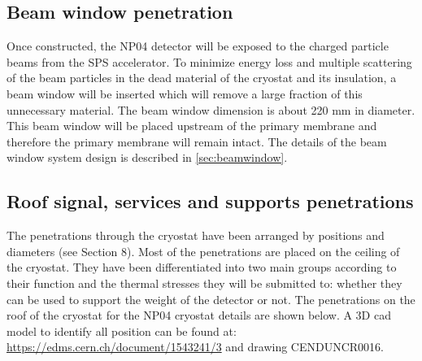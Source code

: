 \subsection{Beam window penetration}

Once constructed, the NP04 detector will be exposed to the charged particle beams from the SPS accelerator. To minimize energy loss and multiple scattering of the beam particles in the dead material of the cryostat and its insulation, a beam window will be inserted which will remove a large fraction of this unnecessary material. The beam window dimension is about 220 mm in diameter. This beam window will be placed upstream of the primary membrane and therefore the primary membrane will remain intact. The details of the beam window system design is described in \ref{sec:beamwindow}.

\subsection{Roof signal, services and supports penetrations}

The penetrations through the cryostat have been arranged by positions and diameters (see Section 8). Most of the penetrations are placed on the ceiling of the cryostat. They have been differentiated into two main groups according to their function and the thermal stresses they will be submitted to: whether they can be used to support the weight of the detector or not.
The penetrations on the roof of the cryostat for the NP04 cryostat details are shown below.  A 3D cad model to identify all position can be found at:
\url{https://edms.cern.ch/document/1543241/3} and drawing CENDUNCR0016. 


